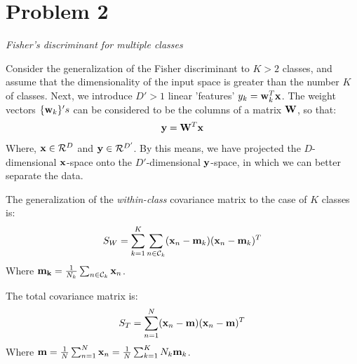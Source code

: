 \documentclass{article}
\theoremstyle{definition}
\theoremstyle{definition}
\theoremstyle{remark}
\begin{document}
\section*{Problem 2}\label{problem:2}
\emph{Fisher's discriminant for multiple classes}

Consider the generalization of the Fisher discriminant to $K>2$ classes, and assume that the dimensionality of the input space is greater than the number $K$ of classes. Next, we introduce $D'>1$ linear 'features' $y_{k}=\bold{w}_{k}^{T}\bold{x}$. The weight vectors $\{\bold{w}_{k}\}'s$ can be considered to be the columns of a matrix $\bold{W}$, so that:
\[
\bold{y}=\bold{W}^{T}\bold{x}
\]
Where, $\bold{x}\in \mathcal{R}^{D}$ and $\bold{y} \in \mathcal{R}^{D'}$. By this means, we have projected the $D$-dimensional $\bold{x}$-space onto the $D'$-dimensional $\bold{y}$-space, in which we can better separate the data.

The generalization of the \emph{within-class} covariance matrix to the case of $K$ classes is:
\begin{eqnarray}
S_{W}=\sum_{k=1}^{K}\sum_{n\in \mathcal{C}_{k}}(\bold{x}_{n}-\bold{m}_{k})(\bold{x}_{n}-\bold{m}_{k})^{T}
\end{eqnarray}
Where $\bold{m_{k}}=\frac{1}{N_{k}}\sum_{n\in \mathcal{C}_{k}}\bold{x}_{n}$.

The total covariance matrix is:
\begin{eqnarray}
S_{T}=\sum_{n=1}^{N}(\bold{x}_{n}-\bold{m})(\bold{x}_{n}-\bold{m})^{T}
\end{eqnarray}
Where $\bold{m}=\frac{1}{N}\sum_{n=1}^{N}\bold{x}_{n}=\frac{1}{N}\sum_{k=1}^{K}N_{k}\bold{m}_{k}$.
\end{document}
